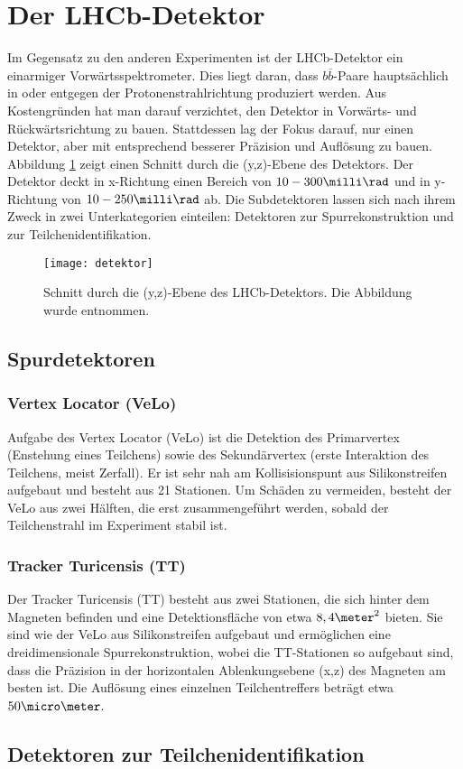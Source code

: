 \section{Der LHCb-Detektor}
Im Gegensatz zu den anderen Experimenten ist der LHCb-Detektor ein einarmiger Vorwärtsspektrometer. Dies liegt daran, dass $b\overline{b}$-Paare hauptsächlich in oder entgegen der Protonenstrahlrichtung produziert werden. Aus Kostengründen hat man darauf verzichtet, den Detektor in Vorwärts- und Rückwärtsrichtung zu bauen. Stattdessen lag der Fokus darauf, nur einen Detektor, aber mit entsprechend besserer Präzision und Auflösung zu bauen. Abbildung \ref{fig:detektor} zeigt einen Schnitt durch die (y,z)-Ebene des Detektors. Der Detektor deckt in x-Richtung einen Bereich von $10-300\milli\rad$ und in y-Richtung von $10-250\milli\rad$ ab. Die Subdetektoren lassen sich nach ihrem Zweck in zwei Unterkategorien einteilen: Detektoren zur Spurrekonstruktion und zur Teilchenidentifikation.

\begin{figure}[hptb]
\centering
\texttt{[image: detektor]}
\caption{Schnitt durch die (y,z)-Ebene des LHCb-Detektors. Die Abbildung wurde \cite{detector} entnommen.}
\label{fig:detektor}
\end{figure}


\subsection{Spurdetektoren}
\subsubsection{Vertex Locator (VeLo)}
Aufgabe des Vertex Locator (VeLo) ist die Detektion des Primarvertex (Enstehung eines Teilchens) sowie des Sekundärvertex (erste Interaktion des Teilchens, meist Zerfall). Er ist sehr nah am Kollisisionspunt aus Silikonstreifen aufgebaut und besteht aus 21 Stationen. Um Schäden zu vermeiden, besteht der VeLo aus zwei Hälften, die erst zusammengeführt werden, sobald der Teilchenstrahl im Experiment stabil ist.

\subsubsection{Tracker Turicensis (TT)}
Der Tracker Turicensis (TT) besteht aus zwei Stationen, die sich hinter dem Magneten befinden und eine Detektionsfläche von etwa $8,4\meter^2$ bieten. Sie sind wie der VeLo aus Silikonstreifen aufgebaut und ermöglichen eine dreidimensionale Spurrekonstruktion, wobei die TT-Stationen so aufgebaut sind, dass die Präzision in der horizontalen Ablenkungsebene (x,z) des Magneten am besten ist. Die Auflösung eines einzelnen Teilchentreffers beträgt etwa $50\micro\meter$.


\subsection{Detektoren zur Teilchenidentifikation}
